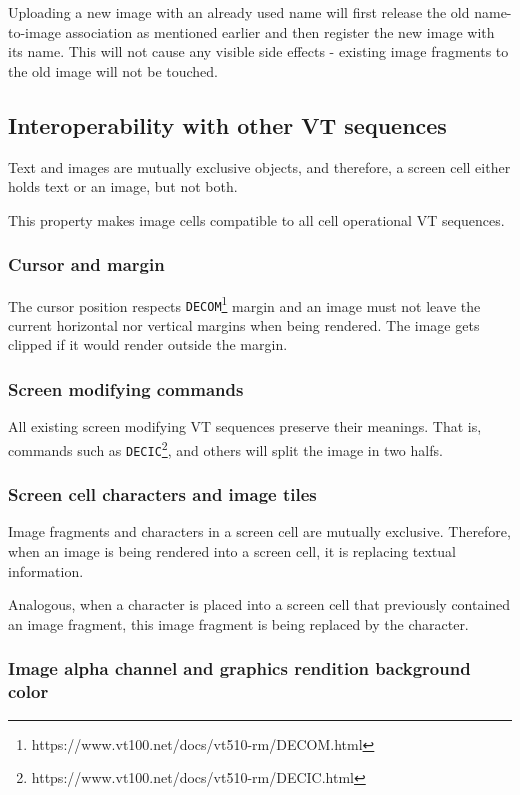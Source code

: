 \documentclass[a4paper]{article}
\newcommand{\code}[1]{\colorbox{light-gray}{\texttt{#1}}}
\begin{document}
Uploading a new image with an already used name will first release the old name-to-image association
as mentioned earlier and then register the new image with its name. This will not cause
any visible side effects - existing image fragments to the old image will not be touched.


\subsection{Interoperability with other VT sequences} %

Text and images are mutually exclusive objects, and therefore,
a screen cell either holds text or an image, but not both.

This property makes image cells compatible to all cell operational VT sequences.

\subsubsection*{Cursor and margin}

The cursor position respects
\code{DECOM}\footnote{https://www.vt100.net/docs/vt510-rm/DECOM.html}
margin and an image must not leave the current horizontal nor vertical margins
when being rendered.
The image gets clipped if it would render outside the margin.

\subsubsection*{Screen modifying commands}

All existing screen modifying VT sequences preserve their meanings.
That is, commands such as
\code{DECIC}\footnote{https://www.vt100.net/docs/vt510-rm/DECIC.html},
and others will split the image in two halfs.

\subsubsection*{Screen cell characters and image tiles}

Image fragments and characters in a screen cell are mutually exclusive.
Therefore, when an image is being rendered into a screen cell,
it is replacing textual information.

Analogous, when a character is placed into a screen cell that previously
contained an image fragment, this image fragment is being replaced by the
character.

\subsubsection*{Image alpha channel and graphics rendition background color}
\end{document}
